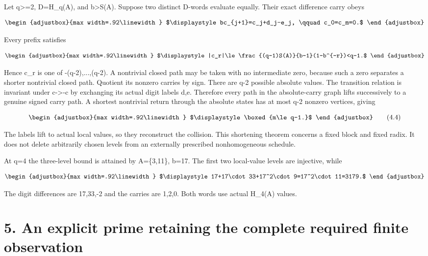 Let q\textgreater=2, D=H\_q(A), and b\textgreater S(A). Suppose two distinct D-words evaluate equally. Their exact difference carry obeys

\[
\begin{adjustbox}{max width=.92\linewidth}
$\displaystyle bc_{j+1}=c_j+d_j-e_j,
\qquad c_0=c_m=0.$
\end{adjustbox}
\]

Every prefix satisfies

\[
\begin{adjustbox}{max width=.92\linewidth}
$\displaystyle |c_r|\le\frac{(q-1)S(A)}{b-1}(1-b^{-r})<q-1.$
\end{adjustbox}
\]

Hence c\_r is one of -(q-2),...,(q-2). A nontrivial closed path may be taken with no intermediate zero, because such a zero separates a shorter nontrivial closed path. Quotient its nonzero carries by sign. There are q-2 possible absolute values. The transition relation is invariant under c-\textgreater-c by exchanging its actual digit labels d,e. Therefore every path in the absolute-carry graph lifts successively to a genuine signed carry path. A shortest nontrivial return through the absolute states has at most q-2 nonzero vertices, giving

\[
\begin{adjustbox}{max width=.92\linewidth}
$\displaystyle \boxed{m\le q-1.}$
\end{adjustbox}
\tag{4.4}
\]

The labels lift to actual local values, so they reconstruct the collision. This shortening theorem concerns a fixed block and fixed radix. It does not delete arbitrarily chosen levels from an externally prescribed nonhomogeneous schedule.

At q=4 the three-level bound is attained by A=\{3,11\}, b=17. The first two local-value levels are injective, while

\[
\begin{adjustbox}{max width=.92\linewidth}
$\displaystyle 17+17\cdot33+17^2\cdot9=17^2\cdot11=3179.$
\end{adjustbox}
\]

The digit differences are 17,33,-2 and the carries are 1,2,0. Both words use actual H\_4(A) values.

\section{5. An explicit prime retaining the complete required finite observation}\label{n22-an-explicit-prime-retaining-the-complete-required-finite-observation}

